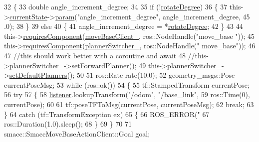 \begin{DoxyCode}
32     \{
33         \textcolor{keywordtype}{double} angle\_increment\_degree;
34 
35         \textcolor{keywordflow}{if} (!\hyperlink{classSbRotate_aeaec32fdba434d9482548bda764b0fe0}{rotateDegree})
36         \{
37             this->\hyperlink{classsmacc_1_1SmaccSubStateBehavior_a62e2b9da4a446f09396d0b4c01659b88}{currentState}->\hyperlink{classsmacc_1_1ISmaccState_a4982f2187ed6da337462721146e8ef70}{param}(\textcolor{stringliteral}{"angle\_increment\_degree"}, angle\_increment\_degree, 45
      .0);
38         \}
39         \textcolor{keywordflow}{else}
40         \{
41             angle\_increment\_degree = *\hyperlink{classSbRotate_aeaec32fdba434d9482548bda764b0fe0}{rotateDegree};
42         \}
43         
44         this->\hyperlink{classsmacc_1_1SmaccSubStateBehavior_a4d25c4ba8ec01c489df172a71bb1c37d}{requiresComponent}(\hyperlink{classSbRotate_ab6cc0ea1c2e05c0e1ebd57ed6c7d6725}{moveBaseClient\_}, ros::NodeHandle(\textcolor{stringliteral}{"move\_base
      "}));
45         this->\hyperlink{classsmacc_1_1SmaccSubStateBehavior_a4d25c4ba8ec01c489df172a71bb1c37d}{requiresComponent}(\hyperlink{classSbRotate_a21a2ad273b990ffcd617b730310f9e98}{plannerSwitcher\_}, ros::NodeHandle(\textcolor{stringliteral}{"
      move\_base"}));
46 
47         \textcolor{comment}{//this should work better with a coroutine and await}
48         \textcolor{comment}{//this->plannerSwitcher\_->setForwardPlanner();}
49         this->\hyperlink{classSbRotate_a21a2ad273b990ffcd617b730310f9e98}{plannerSwitcher\_}->\hyperlink{classsmacc__planner__switcher_1_1PlannerSwitcher_a9672bbbb245b3a5120b365810c9cc746}{setDefaultPlanners}();
50 
51         ros::Rate rate(10.0);
52         geometry\_msgs::Pose currentPoseMsg;
53         \textcolor{keywordflow}{while} (ros::ok())
54         \{
55             tf::StampedTransform currentPose;
56             \textcolor{keywordflow}{try}
57             \{
58                 \hyperlink{classSbRotate_a385971c366b3f6e95a0c71870eeca95c}{listener}.lookupTransform(\textcolor{stringliteral}{"/odom"}, \textcolor{stringliteral}{"/base\_link"},
59                                          ros::Time(0), currentPose);
60 
61                 tf::poseTFToMsg(currentPose, currentPoseMsg);
62                 \textcolor{keywordflow}{break};
63             \}
64             \textcolor{keywordflow}{catch} (tf::TransformException ex)
65             \{
66                 ROS\_ERROR(\textcolor{stringliteral}{"%
67                 ros::Duration(1.0).sleep();
68             \}
69         \}
70 
71         smacc::SmaccMoveBaseActionClient::Goal goal;
}
\end{DoxyCode}
